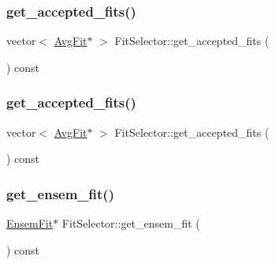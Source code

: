 \mbox{\label{classFitSelector_adab655156a6e59ccb556021cb60d038d}} 
\subsubsection{\texorpdfstring{get\_accepted\_fits()}{get\_accepted\_fits()}\hspace{0.1cm}{\footnotesize\ttfamily [1/2]}}
{\footnotesize\ttfamily vector$<$ \mbox{\hyperlink{classAvgFit}{Avg\+Fit}}$\ast$ $>$ Fit\+Selector\+::get\+\_\+accepted\+\_\+fits (\begin{DoxyParamCaption}{ }\end{DoxyParamCaption}) const\hspace{0.3cm}{\ttfamily [inline]}}

\mbox{\label{classFitSelector_adab655156a6e59ccb556021cb60d038d}} 
\subsubsection{\texorpdfstring{get\_accepted\_fits()}{get\_accepted\_fits()}\hspace{0.1cm}{\footnotesize\ttfamily [2/2]}}
{\footnotesize\ttfamily vector$<$ \mbox{\hyperlink{classAvgFit}{Avg\+Fit}}$\ast$ $>$ Fit\+Selector\+::get\+\_\+accepted\+\_\+fits (\begin{DoxyParamCaption}{ }\end{DoxyParamCaption}) const\hspace{0.3cm}{\ttfamily [inline]}}

\mbox{\label{classFitSelector_a04446a02122fb9225e758ee9e8218f9c}} 
\subsubsection{\texorpdfstring{get\_ensem\_fit()}{get\_ensem\_fit()}\hspace{0.1cm}{\footnotesize\ttfamily [1/2]}}
{\footnotesize\ttfamily \mbox{\hyperlink{classEnsemFit}{Ensem\+Fit}}$\ast$ Fit\+Selector\+::get\+\_\+ensem\+\_\+fit (\begin{DoxyParamCaption}{ }\end{DoxyParamCaption}) const\hspace{0.3cm}{\ttfamily [inline]}}

